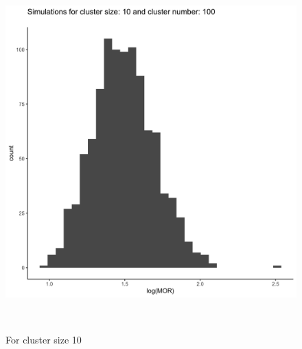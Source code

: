 \documentclass[
  letterpaper,
  DIV=11,
  numbers=noendperiod,
  titlepage]{scrartcl}
\begin{document}
\begin{figure}
\begin{minipage}[t]{0.50\linewidth}
{{\includegraphics{../plots/ran-int/hist_100_10.png}

}

\caption{For cluster size 10}

}

\end{minipage}%
\newline
\begin{minipage}[t]{\linewidth}

{\centering 

~

}

\end{minipage}%
\newline
\begin{minipage}[t]{0.50\linewidth}

{\centering 

\raisebox{-\height}{

}}
\end{minipage}
\end{figure}
\end{document}
